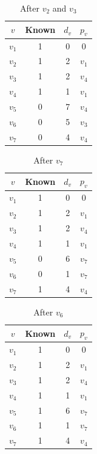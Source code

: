 \begin{minipage}{0.33\textwidth}
\begin{table}[H]
  \centering
  \begin{tabular}{c|c|c|c}
      \toprule
      \(v\) & Known & \(d_v\) & \(p_v\)  \\
    \midrule
      \(v_1\) & 1 & 0 & 0  \\
      \(v_2\) & 1 & 2 & \(v_1\)  \\
      \(v_3\) & 1 & 2 & \(v_4\)  \\
      \(v_4\) & 1 & 1 & \(v_1\)  \\
      \(v_5\) & 0 & 7 & \(v_4\)  \\
      \(v_6\) & 0 & 5 & \(v_3\)  \\
      \(v_7\) & 0 & 4 & \(v_4\)  \\
      \bottomrule
  \end{tabular}
  \caption*{After \(v_2\) and \(v_3\)}
\end{table}
\end{minipage}
\begin{minipage}{0.33\textwidth}
\begin{table}[H]
  \centering
  \begin{tabular}{c|c|c|c}
      \toprule
      \(v\) & Known & \(d_v\) & \(p_v\)  \\
    \midrule
      \(v_1\) & 1 & 0 & 0  \\
      \(v_2\) & 1 & 2 & \(v_1\)  \\
      \(v_3\) & 1 & 2 & \(v_4\)  \\
      \(v_4\) & 1 & 1 & \(v_1\)  \\
      \(v_5\) & 0 & 6 & \(v_7\)  \\
      \(v_6\) & 0 & 1 & \(v_7\)  \\
      \(v_7\) & 1 & 4 & \(v_4\)  \\
      \bottomrule
  \end{tabular}
  \caption*{After \(v_7\)}
\end{table}
\end{minipage}
\begin{minipage}{0.33\textwidth}
\begin{table}[H]
  \centering
  \begin{tabular}{c|c|c|c}
      \toprule
      \(v\) & Known & \(d_v\) & \(p_v\)  \\
    \midrule
      \(v_1\) & 1 & 0 & 0  \\
      \(v_2\) & 1 & 2 & \(v_1\)  \\
      \(v_3\) & 1 & 2 & \(v_4\)  \\
      \(v_4\) & 1 & 1 & \(v_1\)  \\
      \(v_5\) & 1 & 6 & \(v_7\)  \\
      \(v_6\) & 1 & 1 & \(v_7\)  \\
      \(v_7\) & 1 & 4 & \(v_4\)  \\
      \bottomrule
  \end{tabular}
  \caption*{After \(v_6\)}
\end{table}
\end{minipage}

